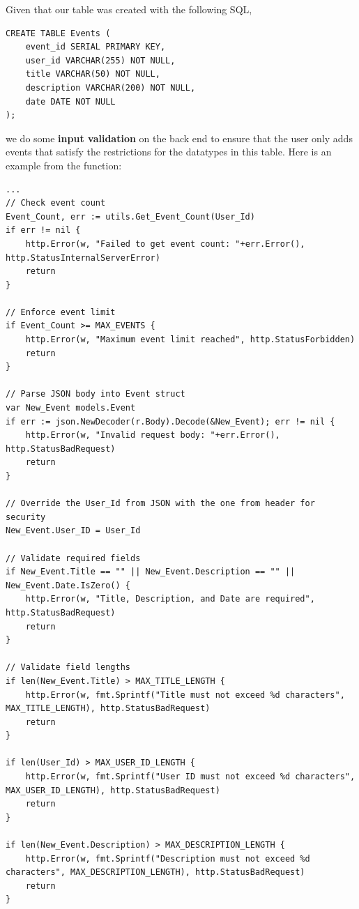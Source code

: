 Given that our table was created with the following SQL,

\begin{verbatim}
CREATE TABLE Events (
    event_id SERIAL PRIMARY KEY,
    user_id VARCHAR(255) NOT NULL,
    title VARCHAR(50) NOT NULL,
    description VARCHAR(200) NOT NULL,
    date DATE NOT NULL
);
\end{verbatim}

we do some \textbf{input validation} on the back end to ensure that the user only adds events that satisfy the restrictions for
the datatypes in this table. Here is an example from the  function:

\begin{verbatim}
...
// Check event count
Event_Count, err := utils.Get_Event_Count(User_Id)
if err != nil {
    http.Error(w, "Failed to get event count: "+err.Error(), http.StatusInternalServerError)
    return
}

// Enforce event limit
if Event_Count >= MAX_EVENTS {
    http.Error(w, "Maximum event limit reached", http.StatusForbidden)
    return
}

// Parse JSON body into Event struct
var New_Event models.Event
if err := json.NewDecoder(r.Body).Decode(&New_Event); err != nil {
    http.Error(w, "Invalid request body: "+err.Error(), http.StatusBadRequest)
    return
}

// Override the User_Id from JSON with the one from header for security
New_Event.User_ID = User_Id

// Validate required fields
if New_Event.Title == "" || New_Event.Description == "" || New_Event.Date.IsZero() {
    http.Error(w, "Title, Description, and Date are required", http.StatusBadRequest)
    return
}

// Validate field lengths
if len(New_Event.Title) > MAX_TITLE_LENGTH {
    http.Error(w, fmt.Sprintf("Title must not exceed %d characters", MAX_TITLE_LENGTH), http.StatusBadRequest)
    return
}

if len(User_Id) > MAX_USER_ID_LENGTH {
    http.Error(w, fmt.Sprintf("User ID must not exceed %d characters", MAX_USER_ID_LENGTH), http.StatusBadRequest)
    return
}

if len(New_Event.Description) > MAX_DESCRIPTION_LENGTH {
    http.Error(w, fmt.Sprintf("Description must not exceed %d characters", MAX_DESCRIPTION_LENGTH), http.StatusBadRequest)
    return
}
\end{verbatim}

